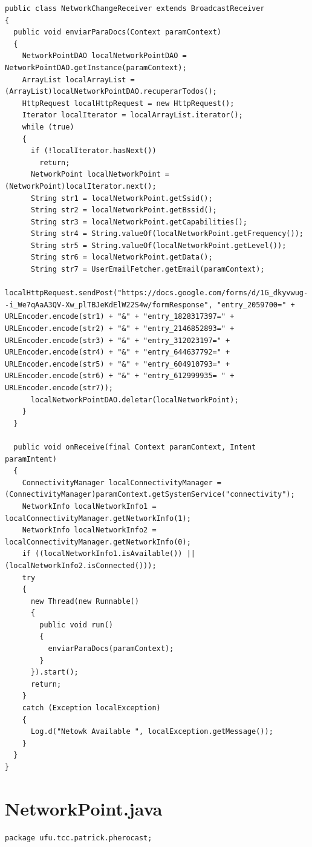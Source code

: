 \documentclass[12pt, %
openright, 
oneside,
a4paper,
brazil]{facom-ufu-abntex2}
\begin{document}
\begin{anexosenv}
\begin{lstlisting}
public class NetworkChangeReceiver extends BroadcastReceiver
{
  public void enviarParaDocs(Context paramContext)
  {
    NetworkPointDAO localNetworkPointDAO = NetworkPointDAO.getInstance(paramContext);
    ArrayList localArrayList = (ArrayList)localNetworkPointDAO.recuperarTodos();
    HttpRequest localHttpRequest = new HttpRequest();
    Iterator localIterator = localArrayList.iterator();
    while (true)
    {
      if (!localIterator.hasNext())
        return;
      NetworkPoint localNetworkPoint = (NetworkPoint)localIterator.next();
      String str1 = localNetworkPoint.getSsid();
      String str2 = localNetworkPoint.getBssid();
      String str3 = localNetworkPoint.getCapabilities();
      String str4 = String.valueOf(localNetworkPoint.getFrequency());
      String str5 = String.valueOf(localNetworkPoint.getLevel());
      String str6 = localNetworkPoint.getData();
      String str7 = UserEmailFetcher.getEmail(paramContext);
      localHttpRequest.sendPost("https://docs.google.com/forms/d/1G_dkyvwug--i_We7qAaA3QV-Xw_plTBJeKdElW22S4w/formResponse", "entry_2059700=" + URLEncoder.encode(str1) + "&" + "entry_1828317397=" + URLEncoder.encode(str2) + "&" + "entry_2146852893=" + URLEncoder.encode(str3) + "&" + "entry_312023197=" + URLEncoder.encode(str4) + "&" + "entry_644637792=" + URLEncoder.encode(str5) + "&" + "entry_604910793=" + URLEncoder.encode(str6) + "&" + "entry_612999935= " + URLEncoder.encode(str7));
      localNetworkPointDAO.deletar(localNetworkPoint);
    }
  }

  public void onReceive(final Context paramContext, Intent paramIntent)
  {
    ConnectivityManager localConnectivityManager = (ConnectivityManager)paramContext.getSystemService("connectivity");
    NetworkInfo localNetworkInfo1 = localConnectivityManager.getNetworkInfo(1);
    NetworkInfo localNetworkInfo2 = localConnectivityManager.getNetworkInfo(0);
    if ((localNetworkInfo1.isAvailable()) || (localNetworkInfo2.isConnected()));
    try
    {
      new Thread(new Runnable()
      {
        public void run()
        {
          enviarParaDocs(paramContext);
        }
      }).start();
      return;
    }
    catch (Exception localException)
    {
      Log.d("Netowk Available ", localException.getMessage());
    }
  }
}

\end{lstlisting}
\section{NetworkPoint.java}
\begin{lstlisting}
package ufu.tcc.patrick.pherocast;


\end{lstlisting}
\end{anexosenv}
\end{document}
